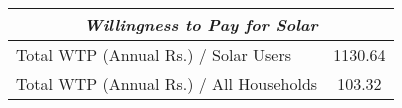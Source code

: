 \begin{table}[htbp]\centering
\def\sym#1{\ifmmode^{#1}\else\(^{#1}\)\fi}
\begin{tabular}{l*{1}{c}}
\toprule
 \multicolumn{2}{c}{\emph{Willingness to Pay for Solar}}          \\
\midrule
Total WTP (Annual Rs.) / Solar Users&       1130.64\\
Total WTP (Annual Rs.) / All Households&        103.32\\
\bottomrule
\end{tabular}
\end{table}

